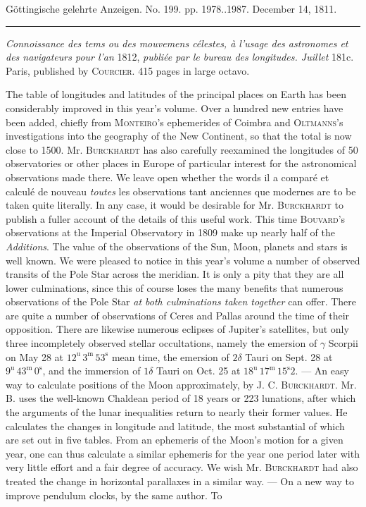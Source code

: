 \clearpage
{}
\hypertarget{native-542-lower}{}\label{native-542-lower}
\begin{center}\small Göttingische gelehrte Anzeigen. No. 199. pp. 1978..1987. December 14, 1811.\\[3pt]\rule{.72\linewidth}{.3pt}\end{center}

\emph{Connoissance des tems ou des mouvemens célestes, à l'usage des astronomes et des navigateurs pour l'an} 1812, \emph{publiée par le bureau des longitudes. Juillet} 181c. Paris, published by \textsc{Courcier}. 415 pages in large octavo.

The table of longitudes and latitudes of the principal places on Earth has been considerably improved in this year's volume. Over a hundred new entries have been added, chiefly from \textsc{Monteiro}'s ephemerides of Coimbra and \textsc{Oltmanns}'s investigations into the geography of the New Continent, so that the total is now close to 1500. Mr. \textsc{Burckhardt} has also carefully reexamined the longitudes of 50 observatories or other places in Europe of particular interest for the astronomical observations made there. We leave open whether the words il a comparé et calculé de nouveau \emph{toutes} les observations tant anciennes que modernes are to be taken quite literally. In any case, it would be desirable for Mr. \textsc{Burckhardt} to publish a fuller account of the details of this useful work. This time \textsc{Bouvard}'s observations at the Imperial Observatory in 1809 make up nearly half of the \emph{Additions}. The value of the observations of the Sun, Moon, planets and stars is well known. We were pleased to notice in this year's volume a number of observed transits of the Pole Star across the meridian. It is only a pity that they are all lower culminations, since this of course loses the many benefits that numerous observations of the Pole Star \emph{at both culminations taken together} can offer. There are quite a number of observations of Ceres and Pallas around the time of their opposition. There are likewise numerous eclipses of Jupiter's satellites, but only three incompletely observed stellar occultations, namely the emersion of $\gamma$ Scorpii on May 28 at $12^{\mathrm u}\,3^{\mathrm m}\,53^{\mathrm s}$ mean time, the emersion of $2\delta$ Tauri on Sept. 28 at $9^{\mathrm u}\,43^{\mathrm m}\,0^{\mathrm s}$, and the immersion of $1\delta$ Tauri on Oct. 25 at $18^{\mathrm u}\,17^{\mathrm m}\,15^{\mathrm s}2$. --- An easy way to calculate positions of the Moon approximately, by J. C. \textsc{Burckhardt}. Mr. B. uses the well-known Chaldean period of 18 years or 223 lunations, after which the arguments of the lunar inequalities return to nearly their former values. He calculates the changes in longitude and latitude, the most substantial of which are set out in five tables. From an ephemeris of the Moon's motion for a given year, one can thus calculate a similar ephemeris for the year one period later with very little effort and a fair degree of accuracy. We wish Mr. \textsc{Burckhardt} had also treated the change in horizontal parallaxes in a similar way. --- On a new way to improve pendulum clocks, by the same author. To 